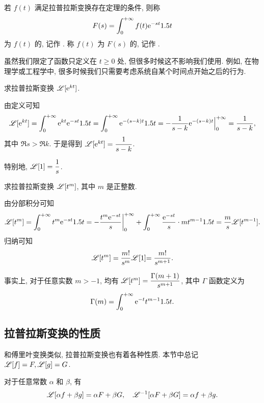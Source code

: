 \begin{definition}
  若 $f(t)$ 满足拉普拉斯变换存在定理的条件, 则称
  \[
    F(s)=\displaystyle\int_0^{+\infty} f(t)\mathrm{e}^{-st}1.5 t
  \]
  为 $f(t)$ 的, 记作 \nouns{$\msl[f(t)]$}.
  称 $f(t)$ 为 $F(s)$ 的, 记作 .
\end{definition}

虽然我们限定了函数只定义在 $t\ge 0$ 处, 但很多时候这不影响我们使用.
例如, 在物理学或工程学中, 很多时候我们只需要考虑系统自某个时间点开始之后的行为.

\begin{example}
  求拉普拉斯变换 $\mathscr{L}[\mathrm{e}^{kt}]$.
\end{example}

\begin{solution}
  由定义可知
  \[
     \mathscr{L}[\mathrm{e}^{kt}]
    =\displaystyle\int_0^{+\infty}\mathrm{e}^{kt}\mathrm{e}^{-st}1.5 t
    =\displaystyle\int_0^{+\infty}\mathrm{e}^{-(s-k)t}1.5 t
    =-\frac1{s-k}\mathrm{e}^{-(s-k)t}\Big|_0^{+\infty}
    =\frac1{s-k},
  \]
  其中 $\Re s>\Re k$.
  于是得到 $\mathscr{L}[\mathrm{e}^{kt}]=\dfrac1{s-k}$.
\end{solution}

特别地, $\mathscr{L}[1]=\dfrac1s$.

\begin{example}
  求拉普拉斯变换 $\mathscr{L}[t^m]$, 其中 $m$ 是正整数.
\end{example}

\begin{solution}
  由分部积分可知
  \[
     \mathscr{L}[t^m]
    =\displaystyle\int_0^{+\infty} t^m\mathrm{e}^{-st}1.5 t
    =-\frac{t^m\mathrm{e}^{-st}}s\bigg|_0^{+\infty}+\displaystyle\int_0^{+\infty}\frac{\mathrm{e}^{-st}}s\cdot mt^{m-1}1.5 t
    =\frac ms\mathscr{L}[t^{m-1}].
  \]
  归纳可知
  \[
    \mathscr{L}[t^m]=\dfrac{m!}{s^m}\mathscr{L}[1]{=\dfrac{m!}{s^{m+1}}}.
  \]
\end{solution}

事实上, 对于任意实数 $m>-1$, 均有 $\mathscr{L}[t^m]=\dfrac{\Gamma(m+1)}{s^{m+1}}$, 其中 $\Gamma$ 函数定义为
\[
  \Gamma(m)=\displaystyle\int_0^{+\infty} \mathrm{e}^{-t}t^{m-1}1.5 t.
\]

\subsection{拉普拉斯变换的性质}

和傅里叶变换类似, 拉普拉斯变换也有着各种性质.
本节中总记 $\mathscr{L}[f]=F,\mathscr{L}[g]=G$.

\begin{theorem}[线性性质]
  对于任意常数 $\alpha$ 和 $\beta$, 有
  \[
    \mathscr{L}[\alpha f+\beta g]=\alpha F+\beta G,\quad
    \mathscr{L}^{-1}[\alpha F+\beta G]=\alpha f+\beta g.
  \]
\end{theorem}

